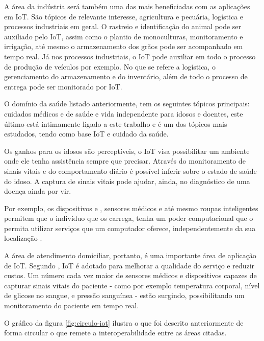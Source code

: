 A área da indústria será também uma das mais beneficiadas com as aplicações em IoT.
São tópicos de relevante interesse, agricultura e pecuária, logística e 
processos industriais em geral. O rastreio e identificação do animal pode ser
auxiliado pelo IoT, assim como o plantio de monoculturas, monitoramento e 
irrigação, até mesmo o armazenamento dos grãos pode ser acompanhado em tempo
real. Já nos processos industriais, o IoT pode auxiliar em todo o processo
de produção de veículos por exemplo. No que se refere a logística, o gerenciamento
do armazenamento e do inventário, além de todo o processo de entrega pode
ser monitorado por IoT.

O domínio da saúde listado anteriormente, tem os seguintes tópicos principais:
cuidados médicos e de saúde e vida independente para idosos e doentes, este último
está intimamente ligado a este trabalho e é um dos tópicos mais estudados, tendo
como base IoT e cuidado da saúde.

Os ganhos para os idosos são perceptíveis, o IoT visa possibilitar um ambiente
onde ele tenha assistência sempre que precisar. Através do monitoramento de 
sinais vitais e do comportamento diário é possível inferir sobre o estado 
de saúde do idoso. A captura de sinais vitais pode ajudar, ainda, no diagnóstico
de uma doença ainda por vir.

Por exemplo, os dispositivos \smartphones e \smartwatches, sensores médicos e até 
mesmo roupas inteligentes permitem que o indivíduo que os carrega, tenha um poder 
computacional que o permita utilizar serviços que um computador oferece, 
independentemente da sua localização \cite{de2003computaccao}.


A área de atendimento domiciliar, portanto, é uma importante área de aplicação de IoT.
Segundo , IoT é adotado para melhorar a qualidade
do serviço e reduzir custos. Um número cada vez maior de sensores médicos e
dispositivos capazes de capturar sinais vitais do paciente  - como por exemplo
temperatura corporal, nível de glicose no sangue, e pressão sanguínea - estão
surgindo, possibilitando um monitoramento do paciente em tempo real.

O gráfico da figura \ref{fig:circulo-iot} ilustra o que foi descrito
anteriormente de forma circular o que remete a interoperabilidade entre as
áreas citadas.

